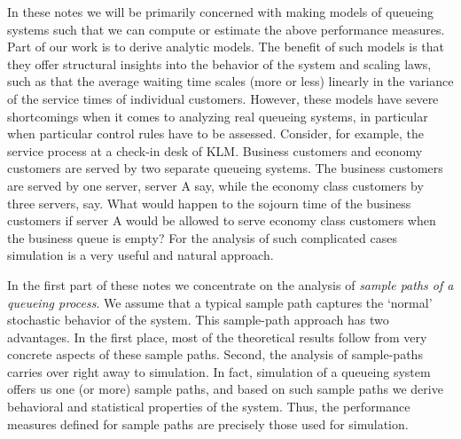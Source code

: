 In these notes we will be primarily concerned with making models of
queueing systems such that we can compute or estimate the above
performance measures.  Part of our work is to derive analytic
models. The benefit of such models is that they offer structural
insights into the behavior of the system and scaling laws, such as
that the average waiting time scales (more or less) linearly in the
variance of the service times of individual customers. However, these
models have severe shortcomings when it comes to analyzing real
queueing systems, in particular when particular control rules have to
be assessed.  Consider, for example, the service process at a check-in
desk of KLM. Business customers and economy customers are served by
two separate queueing systems. The business customers are served by
one server, server A say, while the economy class customers by three
servers, say. What would happen to the sojourn time of the business
customers if server A would be allowed to serve economy class
customers when the business queue is empty? For the analysis of such complicated
cases simulation is a very useful and natural approach.

In the first part of these notes we concentrate on the analysis of
\emph{sample paths of a queueing process}. We assume that a typical
sample path captures the `normal' stochastic behavior of the
system. This sample-path approach has two advantages. In the first
place, most of the theoretical results follow from very concrete
aspects of these sample paths. Second, the analysis of sample-paths
carries over right away to simulation. In fact, simulation of a
queueing system offers us one (or more) sample paths, and based on
such sample paths we derive behavioral and statistical properties of
the system. Thus, the performance measures defined for sample paths
are precisely those used for simulation.  

